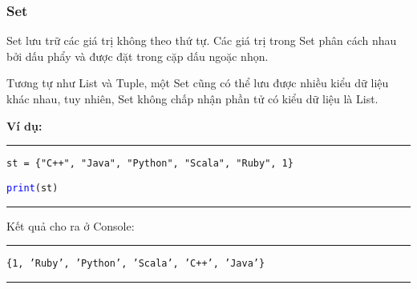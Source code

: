 \subsubsection{Set}
Set lưu trữ các giá trị không theo thứ tự. Các giá trị trong Set phân cách nhau bởi dấu phẩy và được đặt trong cặp dấu ngoặc nhọn.\par
Tương tự như List và Tuple, một Set cũng có thể lưu được nhiều kiểu dữ liệu khác nhau, tuy nhiên, Set không chấp nhận phần tử có kiểu dữ liệu là List.\par
\textbf{Ví dụ:}\\
\rule{\linewidth}{0.2mm}\par
\begin{linenumbers}
	\texttt{st = \{"C++", "Java", "Python", "Scala", "Ruby", 1\}}\par
	\texttt{\textcolor{blue}{print}(st)}\par
\end{linenumbers}
\rule{\linewidth}{0.2mm}\par
\noindent
\resetlinenumber
Kết quả cho ra ở Console:\\
\rule{\linewidth}{0.2mm}\par
\begin{linenumbers}
	\texttt{\{1, 'Ruby', 'Python', 'Scala', 'C++', 'Java'\}}\par
\end{linenumbers}
\rule{\linewidth}{0.2mm}\par
\resetlinenumber
\newpage
